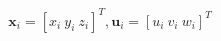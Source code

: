 \documentclass[preview]{standalone}
\begin{document}
\begin{align*}
\mathbf{x}_i = [x_i \ y_i \ z_i]^T, \mathbf{u}_i = [u_i \ v_i \ w_i]^T
\end{align*}
\end{document}

